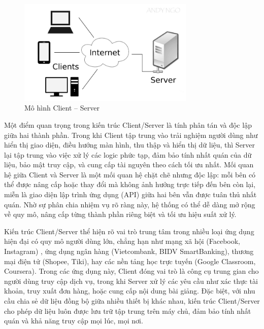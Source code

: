 \begin{figure}[H]
  \centering
  \includegraphics[width=0.75\textwidth]{images/client-server.jpg}
  \caption{Mô hình Client – Server}
  \label{fig:fig17}
\end{figure}

    \begin{flushleft}
      \hspace*{0.8cm}Một điểm quan trọng trong kiến trúc Client/Server là tính phân tán và độc lập giữa hai thành phần. Trong khi Client tập trung vào trải nghiệm người dùng như hiển thị giao diện, điều hướng màn hình, thu thập và hiển thị dữ liệu, thì Server lại tập trung vào việc xử lý các logic phức tạp, đảm bảo tính nhất quán của dữ liệu, bảo mật truy cập, và cung cấp tài nguyên theo cách tối ưu nhất. Mối quan hệ giữa Client và Server là một mối quan hệ chặt chẽ nhưng độc lập: mỗi bên có thể được nâng cấp hoặc thay đổi mà không ảnh hưởng trực tiếp đến bên còn lại, miễn là giao diện lập trình ứng dụng (API) giữa hai bên vẫn được tuân thủ nhất quán. Nhờ sự phân chia nhiệm vụ rõ ràng này, hệ thống có thể dễ dàng mở rộng về quy mô, nâng cấp từng thành phần riêng biệt và tối ưu hiệu suất xử lý.
    \end{flushleft}

    \begin{flushleft}
      \hspace*{0.8cm}Kiến trúc Client/Server thể hiện rõ vai trò trung tâm trong nhiều loại ứng dụng hiện đại có quy mô người dùng lớn, chẳng hạn như mạng xã hội (Facebook, Instagram) \cite{social-apps}, ứng dụng ngân hàng (Vietcombank, BIDV SmartBanking), thương mại điện tử (Shopee, Tiki), hay các nền tảng học trực tuyến (Google Classroom, Coursera). Trong các ứng dụng này, Client đóng vai trò là công cụ trung gian cho người dùng truy cập dịch vụ, trong khi Server xử lý các yêu cầu như xác thực tài khoản, truy xuất đơn hàng, hoặc cung cấp nội dung bài giảng. Đặc biệt, với nhu cầu chia sẻ dữ liệu đồng bộ giữa nhiều thiết bị khác nhau, kiến trúc Client/Server cho phép dữ liệu luôn được lưu trữ tập trung trên máy chủ, đảm bảo tính nhất quán và khả năng truy cập mọi lúc, mọi nơi.
    \end{flushleft}

